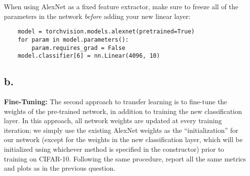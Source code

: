 \documentclass{article}
\newcommand{\1}{\mathbf{1}}
\begin{document}
{    When using AlexNet as a fixed feature extractor, make sure to freeze all of the parameters in the network \textit{before} adding your new linear layer:
    \begin{verbatim}
    model = torchvision.models.alexnet(pretrained=True)
    for param in model.parameters():
        param.requires_grad = False
    model.classifier[6] = nn.Linear(4096, 10)
    \end{verbatim}

\subsection*{b.}

\textbf{Fine-Tuning:} The second approach to transfer learning is to fine-tune the weights of the pre-trained network, in addition to training the new classification layer. In this approach, all network weights are updated at every training iteration; we simply use the existing AlexNet weights as the ``initialization'' for our network (except for the weights in the new classification layer, which will be initialized using whichever method is specified in the constructor) prior to training on CIFAR-10. Following the same procedure, report all the same metrics and plots as in the previous question. 

}
\end{document}
